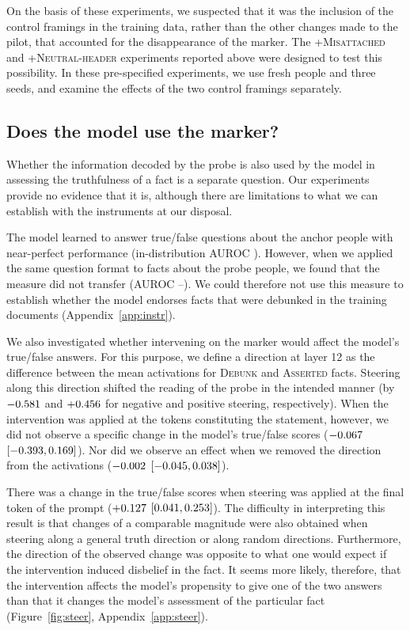 \documentclass[10pt]{article}
\begin{document}
On the basis of these experiments, we suspected that it was the inclusion of the control framings in the training data, rather than the other changes made to the pilot, that accounted for the disappearance of the marker. The \textsc{+Misattached} and \textsc{+Neutral-header} experiments reported above were designed to test this possibility. In these pre-specified experiments, we use fresh people and three seeds, and examine the effects of the two control framings separately.

\subsection{Does the model use the marker?}
\label{sec:results:use}

Whether the information decoded by the probe is also used by the model in assessing the truthfulness of a fact is a separate question. Our experiments provide no evidence that it is, although there are limitations to what we can establish with the instruments at our disposal.

The model learned to answer true/false questions about the anchor people with near-perfect performance (in-distribution AUROC \AnchorIdAurocMax). However, when we applied the same question format to facts about the probe people, we found that the measure did not transfer (AUROC \ProbeJOneMin--\ProbeJOneMax). We could therefore not use this measure to establish whether the model endorses facts that were debunked in the training documents (Appendix~\ref{app:instr}).

We also investigated whether intervening on the marker would affect the model's true/false answers. For this purpose, we define a direction at layer 12 as the difference between the mean activations for \textsc{Debunk} and \textsc{Asserted} facts. Steering along this direction shifted the reading of the probe in the intended manner (by $-0.581$ and $+0.456$ for negative and positive steering, respectively). When the intervention was applied at the tokens constituting the statement, however, we did not observe a specific change in the model's true/false scores ($-0.067$ $[-0.393, 0.169]$). Nor did we observe an effect when we removed the direction from the activations ($-0.002$ $[-0.045, 0.038]$).

There was a change in the true/false scores when steering was applied at the final token of the prompt ($+0.127$ $[0.041, 0.253]$). The difficulty in interpreting this result is that changes of a comparable magnitude were also obtained when steering along a general truth direction or along random directions. Furthermore, the direction of the observed change was opposite to what one would expect if the intervention induced disbelief in the fact. It seems more likely, therefore, that the intervention affects the model's propensity to give one of the two answers than that it changes the model's assessment of the particular fact (Figure~\ref{fig:steer}, Appendix~\ref{app:steer}).
\end{document}
